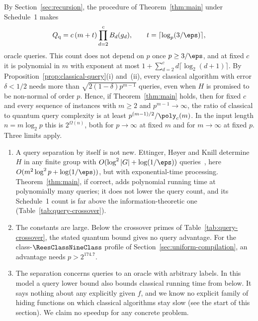 \begin{remark}
\label{rem:query-separation}
By Section~\ref{sec:recursion}, the procedure of Theorem~\ref{thm:main} under Schedule~1 makes
\[
  Q_{\mathrm q} = c\,(m+t)\prod_{d=2}^c B_d(g_d),
  \qquad t = \lceil\log_p(3/\eps)\rceil ,
\]
oracle queries. This count does not depend on $p$ once $p \ge 3/\eps$, and at fixed $c$ it is polynomial in $m$ with exponent at most $1+\sum_{d=2}^c d\lceil\log_2(d+1)\rceil$. By Proposition~\ref{prop:classical-query}(i) and~(ii), every classical algorithm with error $\delta<1/2$ needs more than $\sqrt{2(1-\delta)p^{m-1}}$ queries, even when $H$ is promised to be non-normal of order $p$. Hence, if Theorem~\ref{thm:main} holds, then for fixed $c$ and every sequence of instances with $m\ge2$ and $p^{m-1}\to\infty$, the ratio of classical to quantum query complexity is at least $p^{(m-1)/2}/\poly_c(m)$. In the input length $n = m\log_2 p$ this is $2^{\Omega(n)}$, both for $p\to\infty$ at fixed $m$ and for $m\to\infty$ at fixed $p$. Three limits apply.
\begin{enumerate}[label=(\alph*),leftmargin=2em]
  \item A query separation by itself is not new. Ettinger, H{\o}yer and Knill determine $H$ in any finite group with $O(\log^2|G| + \log(1/\eps))$ queries~\cite[Theorem~2]{EttingerHoyerKnill2004}, here $O(m^2\log^2 p + \log(1/\eps))$, but with exponential-time processing. Theorem~\ref{thm:main}, if correct, adds polynomial running time at polynomially many queries; it does not lower the query count, and its Schedule~1 count is far above the information-theoretic one (Table~\ref{tab:query-crossover}).
  \item The constants are large. Below the crossover primes of Table~\ref{tab:query-crossover}, the stated quantum bound gives no query advantage. For the class-$\ReesClassNineClass$ profile of Section~\ref{sec:uniform-compilation}, an advantage needs $p > 2^{174.7}$.
  \item The separation concerns queries to an oracle with arbitrary labels. In this model a query lower bound also bounds classical running time from below. It says nothing about any explicitly given $f$, and we know no explicit family of hiding functions on which classical algorithms stay slow (see the start of this section). We claim no speedup for any concrete problem.
\end{enumerate}
\end{remark}
